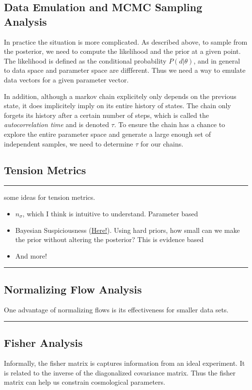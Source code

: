\subsection{Data Emulation and MCMC Sampling Analysis}

In practice the situation is more complicated. As described above, to sample from the posterior, we need to compute the likelihood and the prior at a given point. The likelihood is defined as the conditional probability $P(d|\theta)$, and in general to data space and parameter space are diffferent.
Thus we need a way to emulate data vectors for a given parameter vector.

In addition, although a markov chain explicitely only depends on the previous state, it does implicitely imply on its entire history of states. The chain only forgets its history after a certain number of steps, which is called the \textit{autocorrelation time} and is denoted $\tau$. To ensure the chain has a chance to explore the entire parameter space and generate a large enough set of independent samples, we need to determine $\tau$ for our chains.

\subsection{Tension Metrics}
\hrule
some ideas for tension metrics.
\begin{itemize}
    \item $n_\sigma$, which I think is intuitive to understand. Parameter based
    \item Bayesian Suspiciousness (\href{https://academic.oup.com/mnras/article/496/4/4647/5863223}{Here!}). Using hard priors, how small can we make the prior without altering the posterior? This is evidence based
    \item And more!
\end{itemize}
\hrule

\subsection{Normalizing Flow Analysis}
One advantage of normalizing flows is its effectiveness for smaller data sets. 

\bigskip
\hrule
\subsection{Fisher Analysis}
Informally, the fisher matrix is captures information from an ideal experiment. It is related to the inverse of the diagonalized covariance matrix.  Thus the fisher matrix can help us constrain cosmological parameters.

